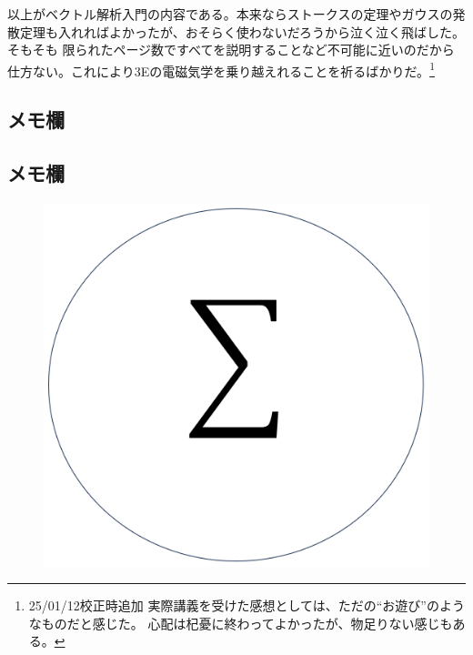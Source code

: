 \documentclass[a4j,dvipdfmx]{jsarticle}
\begin{document}
            以上がベクトル解析入門の内容である。本来ならストークスの定理やガウスの発散定理も入れればよかったが、おそらく使わないだろうから泣く泣く飛ばした。そもそも
            限られたページ数ですべてを説明することなど不可能に近いのだから仕方ない。これにより3Eの電磁気学を乗り越えれることを祈るばかりだ。\footnote{25/01/12校正時追加 実際講義を受けた感想としては、ただの``お遊び''のようなものだと感じた。
            心配は杞憂に終わってよかったが、物足りない感じもある。}
        
        \clearpage
            \subsection*{メモ欄}
        \clearpage
            \subsection*{メモ欄}
        \clearpage

        \thispagestyle{fancy}
        \fancyhead{}

        \begin{figure}
            \centering
            \includegraphics[scale=0.5]{img/QuuNote/icon.png}
        \end{figure}    

        
\end{document}
